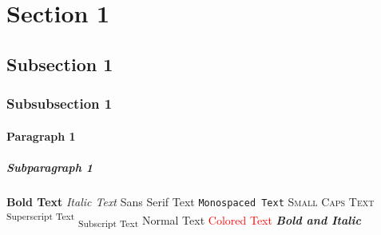 \section{Section 1}
\subsection{Subsection 1}
\subsubsection{Subsubsection 1}
\paragraph{Paragraph 1}
\subparagraph{Subparagraph 1}
\textbf{Bold Text}
\textit{Italic Text}
\textsf{Sans Serif Text}
\texttt{Monospaced Text}
\textsc{Small Caps Text}
\textsuperscript{Superscript Text}
\textsubscript{Subscript Text}
\textnormal{Normal Text}
\textcolor{red}{Colored Text}
\textbf{\textit{Bold and Italic}}

